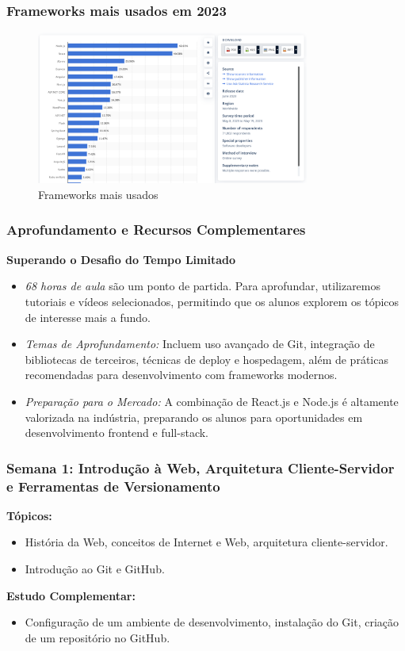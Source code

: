 \begin{frame}[fragile]
  \frametitle{Frameworks mais usados em 2023}
  \begin{figure}
    \centering
    \includegraphics[width=0.8\textwidth]{aulas/aula1-statistica.png}
    \caption{Frameworks mais usados}
  \end{figure}
\end{frame}
\begin{frame}[fragile]
  \frametitle{Aprofundamento e Recursos Complementares}
  \textbf{Superando o Desafio do Tempo Limitado}
  \begin{itemize}
    \item \textit{68 horas de aula} são um ponto de partida. Para aprofundar, utilizaremos tutoriais e vídeos selecionados, permitindo que os alunos explorem os tópicos de interesse mais a fundo.
    \item \textit{Temas de Aprofundamento:} Incluem uso avançado de Git, integração de bibliotecas de terceiros, técnicas de deploy e hospedagem, além de práticas recomendadas para desenvolvimento com frameworks modernos.
    \item \textit{Preparação para o Mercado:} A combinação de React.js e Node.js é altamente valorizada na indústria, preparando os alunos para oportunidades em desenvolvimento frontend e full-stack.
  \end{itemize}
\end{frame}


\begin{frame}[fragile]
  \frametitle{Semana 1: Introdução à Web, Arquitetura Cliente-Servidor e Ferramentas de Versionamento}
  \textbf{Tópicos:}
  \begin{itemize}
    \item História da Web, conceitos de Internet e Web, arquitetura cliente-servidor.
    \item Introdução ao Git e GitHub.
  \end{itemize}
  \textbf{Estudo Complementar:}
  \begin{itemize}
    \item Configuração de um ambiente de desenvolvimento, instalação do Git, criação de um repositório no GitHub.
  \end{itemize}
\end{frame}

